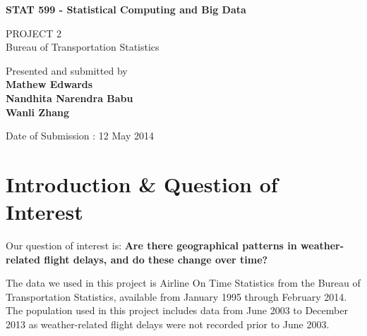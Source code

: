 \documentclass{article}
\begin{document}
\begin{titlepage}
    \begin{center}
        \vspace*{1cm}
        
        \Huge
        \textbf{STAT 599 - Statistical Computing and Big Data}
        
        \vspace{1cm}
        \LARGE
        PROJECT 2\\
        Bureau of Transportation Statistics
        
        \vspace{8cm}
        Presented and submitted by \\
        \textbf{Mathew Edwards} \\
        \textbf{Nandhita Narendra Babu} \\
        \textbf{Wanli Zhang}
        
        \vspace{0.5cm}
        Date of Submission : 12 May 2014
        
       
        
    \end{center}
\end{titlepage}


\section{Introduction \& Question of Interest}
Our question of interest is: \textbf{Are there geographical patterns in weather-related flight delays, and do these change over time?}

The data we used in this project is Airline On Time Statistics from the Bureau of Transportation Statistics, available from January 1995 through February 2014. The population used in this project includes data from June 2003 to December 2013 as weather-related flight delays were not recorded prior to June 2003. 
\end{document}
